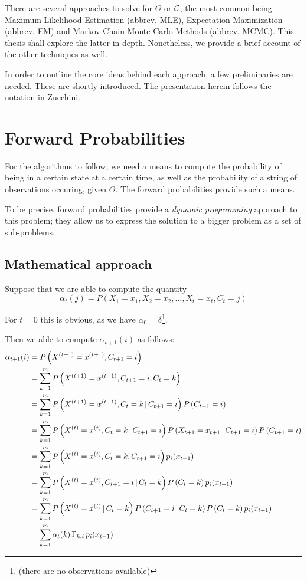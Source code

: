 There are several approaches to solve for $\Theta$ or $\mathcal{C}$, the most common being Maximum Likelihood Estimation (abbrev. MLE), Expectation-Maximization (abbrev. EM) and Markov Chain Monte Carlo Methods (abbrev. MCMC). This thesis shall explore the latter in depth. Nonetheless, we provide a brief account of the other techniques as well.

In order to outline the core ideas behind each approach, a few preliminaries are needed. These are shortly introduced. The presentation herein follows the notation in Zucchini\cite{zucchini}.


\section{Forward Probabilities}
For the algorithms to follow, we need a means to compute the probability of being in a certain state at a certain time, as well as the probability of a string of observations occuring, given $\Theta$. The forward probabilities provide such a means. 

To be precise, forward probabilities provide a \textit{dynamic programming} approach to this problem; they allow us to express the solution to a bigger problem as a set of sub-problems. 


\subsection{Mathematical approach}
\label{chap_math_approach}
Suppose that we are able to compute the quantity 
\[
	\alpha_t(j) = P\left(X_1 = x_1, X_2 = x_2, \dots, X_t = x_t, C_t = j\right)
\]

For $t=0$ this is obvious, as we have $\alpha_0 = \delta$\footnote{(there are no observations available)}. 

Then we able to compute $\alpha_{t+1}(i)$ as follows:
\begin{align}
	\alpha_{t+1}(i)
	&=  P\left(X^{(t+1)} = x^{(t+1)},  C_{t+1} = i\right) \nonumber\\
	 &=  \sum_{k=1}^m P\left(X^{(t+1)} = x^{(t+1)}, C_{t+1} = i, C_t = k\right) \nonumber\\ 
	 &= \sum_{k=1}^m P\left(X^{(t+1)} = x^{(t+1)}, C_t = k \, | \,  C_{t+1} = i\right) P \left( C_{t+1} = i \right) \nonumber\\
	 &= \sum_{k=1}^m P\left(X^{(t)} = x^{(t)}, C_t = k \, | \,  C_{t+1} = i\right) P\left(X_{t+1} = x_{t+1} \, | \,  C_{t+1} = i\right) P \left( C_{t+1} = i \right) \nonumber\\
	 &= \sum_{k=1}^m P \left( X^{(t)} = x^{(t)}, C_t = k, C_{t+1} = i  \right) p_i(x_{t+1}) \nonumber\\
	 &= \sum_{k=1}^m P\left(
	 	X^{(t)} = x^{(t)}, C_{t+1} = i \, | \, C_t = k\right) P\left( C_t = k\right) p_i(x_{t+1})\nonumber\\
 	&= \sum_{k=1}^m P\left(
 		X^{(t)} = x^{(t)} \, | \, C_t = k\right) P\left( C_{t+1} = i \, | \, C_t = k\right) P\left( C_t = k\right) p_i(x_{t+1})\nonumber\\
 	&=  \sum_{k=1}^m \alpha_t(k)  \, \Gamma_{k, i} \, p_i(x_{t+1}) \label{llrecursion}
 	\end{align}


